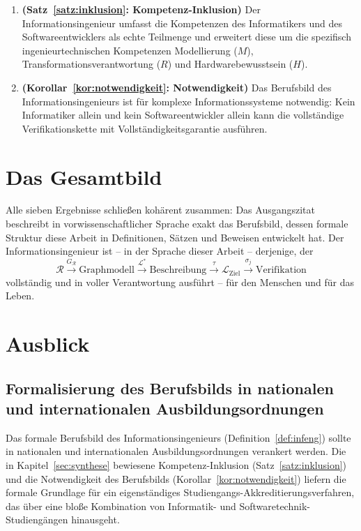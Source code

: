 ﻿\documentclass[a4paper,12pt]{report}
\theoremstyle{definition}
\begin{document}
\begin{enumerate}
  \item \textbf{(Satz~\ref{satz:inklusion}: Kompetenz-Inklusion)}
        Der Informationsingenieur umfasst die Kompetenzen des Informatikers und des
        Softwareentwicklers als echte Teilmenge und erweitert diese um die spezifisch
        ingenieurtechnischen Kompetenzen Modellierung ($M$), Transformationsverantwortung
        ($R$) und Hardwarebewusstsein ($H$).

  \item \textbf{(Korollar~\ref{kor:notwendigkeit}: Notwendigkeit)}
        Das Berufsbild des Informationsingenieurs ist für komplexe Informationssysteme
        notwendig: Kein Informatiker allein und kein Softwareentwickler allein kann
        die vollständige Verifikationskette mit Vollständigkeitsgarantie ausführen.
\end{enumerate}

\section{Das Gesamtbild}

Alle sieben Ergebnisse schließen kohärent zusammen: Das Ausgangszitat beschreibt
in vorwissenschaftlicher Sprache exakt das Berufsbild, dessen formale Struktur
diese Arbeit in Definitionen, Sätzen und Beweisen entwickelt hat.
Der Informationsingenieur ist -- in der Sprache dieser Arbeit -- derjenige, der
\[
  \mathcal{R}
  \xrightarrow{G_\mathcal{R}} \text{Graphmodell}
  \xrightarrow{\mathcal{L}^*} \text{Beschreibung}
  \xrightarrow{\tau} \mathcal{L}_{\text{Ziel}}
  \xrightarrow{\sigma_j} \text{Verifikation}
\]
vollständig und in voller Verantwortung ausführt -- für den Menschen und für das Leben.


\section{Ausblick}
\label{sec:ausblick}

\subsection{Formalisierung des Berufsbilds in nationalen und internationalen Ausbildungsordnungen}

Das formale Berufsbild des Informationsingenieurs (Definition~\ref{def:infeng}) sollte
in nationalen und internationalen Ausbildungsordnungen verankert werden. Die in Kapitel~\ref{sec:synthese}
bewiesene Kompetenz-Inklusion (Satz~\ref{satz:inklusion}) und die Notwendigkeit des Berufsbilds
(Korollar~\ref{kor:notwendigkeit}) liefern die formale Grundlage für ein eigenständiges
Studiengangs-Akkreditierungsverfahren, das über eine bloße Kombination von Informatik-
und Softwaretechnik-Studiengängen hinausgeht.
\end{document}
